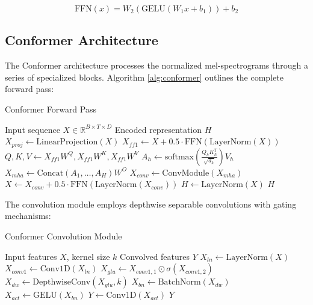 \documentclass[12pt,a4paper]{article}
\begin{document}
\begin{equation}
    \text{FFN}(x) = W_2(\text{GELU}(W_1x + b_1)) + b_2
\end{equation}

\subsection{Conformer Architecture}
The Conformer architecture processes the normalized mel-spectrograms through a series of specialized blocks. Algorithm \ref{alg:conformer} outlines the complete forward pass:

\begin{algorithm}[H]
\caption{Conformer Forward Pass}
\label{alg:conformer}
\begin{algorithmic}[1]
\Require Input sequence $X \in \mathbb{R}^{B \times T \times D}$
\Ensure Encoded representation $H$
\State $X_{proj} \gets \text{LinearProjection}(X)$ 
 
    \State $X_{ff1} \gets X + 0.5 \cdot \text{FFN}(\text{LayerNorm}(X))$ 
    \State $Q, K, V \gets X_{ff1}W^Q, X_{ff1}W^K, X_{ff1}W^V$ 
     
        \State $A_h \gets \text{softmax}(\frac{Q_hK_h^T}{\sqrt{d_k}})V_h$ 
    \EndFor
    \State $X_{mha} \gets \text{Concat}(A_1,\ldots,A_H)W^O$ 
    \State $X_{conv} \gets \text{ConvModule}(X_{mha})$ 
    \State $X \gets X_{conv} + 0.5 \cdot \text{FFN}(\text{LayerNorm}(X_{conv}))$ 
\EndFor
\State $H \gets \text{LayerNorm}(X)$ 
\State \Return $H$
\end{algorithmic}
\end{algorithm}

The convolution module employs depthwise separable convolutions with gating mechanisms:

\begin{algorithm}[H]
\caption{Conformer Convolution Module}
\label{alg:conv_module}
\begin{algorithmic}[1]
\Require Input features $X$, kernel size $k$
\Ensure Convolved features $Y$
\State $X_{ln} \gets \text{LayerNorm}(X)$ 
\State $X_{conv1} \gets \text{Conv1D}(X_{ln})$ 
\State $X_{glu} \gets X_{conv1,1} \odot \sigma(X_{conv1,2})$ 
\State $X_{dw} \gets \text{DepthwiseConv}(X_{glu}, k)$ 
\State $X_{bn} \gets \text{BatchNorm}(X_{dw})$ 
\State $X_{act} \gets \text{GELU}(X_{bn})$ 
\State $Y \gets \text{Conv1D}(X_{act})$ 
\State \Return $Y$
\end{algorithmic}
\end{algorithm}
\end{document}
